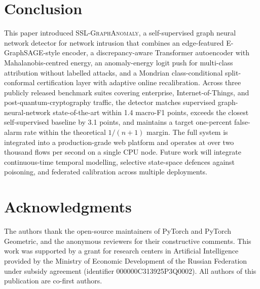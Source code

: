 \documentclass{ieeeaccess}
\begin{document}
\section{Conclusion}
\label{sec:conclusion}
This paper introduced \textsc{SSL-GraphAnomaly}, a self-supervised graph
neural network detector for network intrusion that combines an
edge-featured E-GraphSAGE-style encoder, a discrepancy-aware Transformer
autoencoder with Mahalanobis-centred energy, an anomaly-energy logit push
for multi-class attribution without labelled attacks, and a Mondrian
class-conditional split-conformal certification layer with adaptive online
recalibration. Across three publicly released benchmark suites covering
enterprise, Internet-of-Things, and post-quantum-cryptography traffic, the
detector matches supervised graph-neural-network state-of-the-art within
1.4 macro-F1 points, exceeds the closest self-supervised baseline by 3.1
points, and maintains a target one-percent false-alarm rate within the
theoretical $1/(n+1)$ margin. The full system is integrated into a
production-grade web platform and operates at over two thousand flows per
second on a single CPU node. Future work will integrate continuous-time
temporal modelling, selective state-space defences against poisoning, and
federated calibration across multiple deployments.


\section*{Acknowledgments}
The authors thank the open-source maintainers of PyTorch and PyTorch Geometric, and the anonymous reviewers for their constructive comments. This work was supported by a grant for research centers in Artificial Intelligence provided by the Ministry of Economic Development of the Russian Federation under subsidy agreement (identifier 000000C313925P3Q0002). All authors of this publication are co-first authors.
\end{document}
